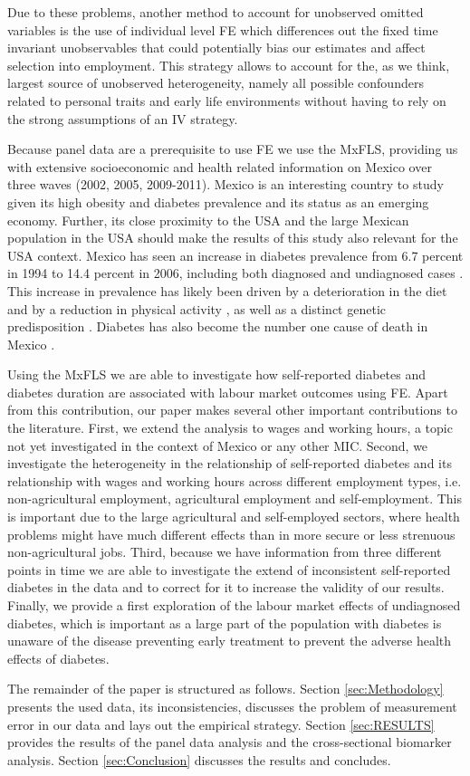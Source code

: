 Due to these problems, another method to account for unobserved omitted variables is
the use of individual level \ac{FE} which differences out
the fixed time invariant unobservables that could potentially bias
our estimates and affect selection into employment. This strategy allows to account for the, as we think, largest source of unobserved heterogeneity, namely all possible confounders related to personal traits and early life environments without having to rely on the strong assumptions of an \ac{IV} strategy.

Because panel data are a prerequisite to use \ac{FE} we use the \ac{MxFLS}, providing us with extensive socioeconomic and health related information on Mexico over three waves (2002, 2005, 2009-2011). Mexico is an interesting country to study given its high obesity and diabetes prevalence and its status as an emerging economy. Further, its close proximity to the USA and the large Mexican population in the USA should make the results of this study also relevant for the USA context. Mexico has seen an increase in diabetes prevalence from 6.7 percent in 1994 to 14.4 percent in 2006, including both diagnosed and undiagnosed cases \citep{Barquera2013}. This increase in prevalence has likely been driven by a deterioration in the diet and by a reduction in physical activity \citep{Barquera2008b,Basu2013}, as well as a distinct genetic predisposition \citep{Williams2013}. Diabetes has also become the number one cause of death in Mexico \cite{23374611}.

Using the \ac{MxFLS} we are able to investigate
how self-reported diabetes and diabetes duration are associated with
labour market outcomes using \ac{FE}. Apart from this contribution, our paper makes
several other important contributions to the literature. First, we
extend the analysis to wages and working hours, a topic not yet investigated
in the context of Mexico or any other \ac{MIC}. Second, we investigate the heterogeneity
in the relationship of self-reported diabetes and its relationship
with wages and working hours across different employment types, i.e.
non-agricultural employment, agricultural employment and self-employment.
This is important due to the large agricultural and self-employed
sectors, where health problems might have much different effects than
in more secure or less strenuous non-agricultural jobs. Third, because
we have information from three different points in time we are able
to investigate the extend of inconsistent self-reported diabetes in
the data and to correct for it to increase the validity of our results.
Finally, we provide a first exploration of the labour market effects
of undiagnosed diabetes, which is important as a large part of the
population with diabetes is unaware of the disease preventing early
treatment to prevent the adverse health effects of diabetes.

The remainder of the paper is structured as follows. Section \ref{sec:Methodology}
presents the used data, its inconsistencies, discusses the problem
of measurement error in our data and lays out the empirical strategy.
Section \ref{sec:RESULTS} provides the results of the panel data
analysis and the cross-sectional biomarker analysis. Section \ref{sec:Conclusion}
discusses the results and concludes.

